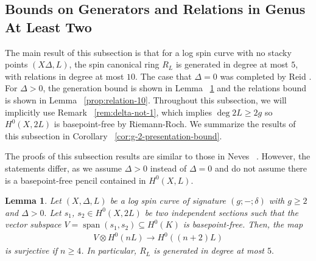 \documentclass{amsart}
\theoremstyle{plain}
\newtheorem{lem}[thm]{Lemma}
\theoremstyle{definition}
\theoremstyle{remark}
\numberwithin{equation}{section}
\newcommand\ssec{\subsection}
\newcommand{\halfcan}{L}
\DeclareMathOperator{\newspan}{span}
\begin{document}
\ssec{Bounds on Generators and Relations in Genus At Least Two}
\label{ssec:bounds-high-genus}

The main result of this subsection is that for a log spin curve with no stacky points $(X \Delta, L)$, the spin canonical ring $R_\halfcan$ is generated in degree at most $5$, with relations in degree at most $10$. The case that $\Delta = 0$ was completed by Reid \cite[Theorem 3.4]{reid:infinitesimal}. For $\Delta > 0$, the generation bound is shown in Lemma ~\ref{lem:generation-5} and the relations bound is shown in Lemma ~\ref{prop:relation-10}. Throughout this subsection, we will implicitly use Remark ~\ref{rem:delta-not-1}, which implies $\deg 2L \geq 2g$ so $H^0(X, 2L)$ is basepoint-free by Riemann-Roch. We summarize the results of this subsection in Corollary ~\ref{cor:g-2-presentation-bound}.

The proofs of this subsection results are similar to those in Neves ~\cite[Proposition III.4 and Proposition III.12]{neves:halfcan}. However, the statements differ, as we assume $\Delta > 0$ instead of $\Delta = 0$ and do not assume there is a basepoint-free pencil contained in $H^0(X, L).$ 

%

\begin{lem}
\label{lem:generation-5}
Let $(X, \Delta, L)$ be a log spin curve of signature $(g; -;\delta)$
with $g \geq 2$ and $\Delta > 0.$ Let $s_1$, $s_2 \in H^0(X, 2L)$
be two independent sections such that the vector subspace $V =
\newspan(s_1, s_2) \subseteq H^0(K)$ is basepoint-free. Then, the map
\begin{align*}
	V \otimes H^0(nL) \rightarrow H^0((n+2)L)
\end{align*}
is surjective if $n \geq 4$. In particular, $R_\halfcan$ is generated in degree at most $5.$
\end{lem}
\end{document}

